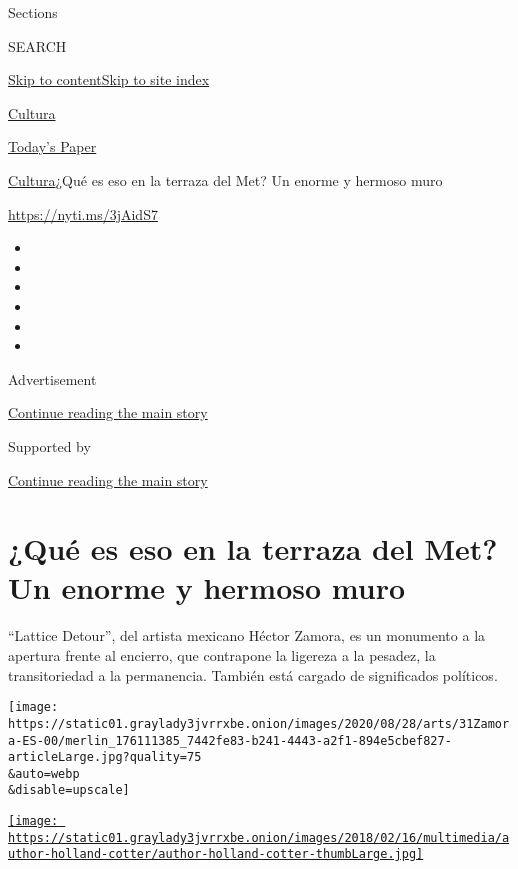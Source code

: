 Sections

SEARCH

\protect\hyperlink{site-content}{Skip to
content}\protect\hyperlink{site-index}{Skip to site index}

\href{https://www.nytimes3xbfgragh.onion/es/section/cultura}{Cultura}

\href{https://myaccount.nytimes3xbfgragh.onion/auth/login?response_type=cookie\&client_id=vi}{}

\href{https://www.nytimes3xbfgragh.onion/section/todayspaper}{Today's
Paper}

\href{/es/section/cultura}{Cultura}\textbar{}¿Qué es eso en la terraza
del Met? Un enorme y hermoso muro

\url{https://nyti.ms/3jAidS7}

\begin{itemize}
\item
\item
\item
\item
\item
\item
\end{itemize}

Advertisement

\protect\hyperlink{after-top}{Continue reading the main story}

Supported by

\protect\hyperlink{after-sponsor}{Continue reading the main story}

\hypertarget{quuxe9-es-eso-en-la-terraza-del-met-un-enorme-y-hermoso-muro}{%
\section{¿Qué es eso en la terraza del Met? Un enorme y hermoso
muro}\label{quuxe9-es-eso-en-la-terraza-del-met-un-enorme-y-hermoso-muro}}

``Lattice Detour'', del artista mexicano Héctor Zamora, es un monumento
a la apertura frente al encierro, que contrapone la ligereza a la
pesadez, la transitoriedad a la permanencia. También está cargado de
significados políticos.

\texttt{[image: https://static01.graylady3jvrrxbe.onion/images/2020/08/28/arts/31Zamora-ES-00/merlin\_176111385\_7442fe83-b241-4443-a2f1-894e5cbef827-articleLarge.jpg?quality=75\\\&auto=webp\\\&disable=upscale]}

\href{https://www.nytimes3xbfgragh.onion/by/holland-cotter}{\texttt{[image: https://static01.graylady3jvrrxbe.onion/images/2018/02/16/multimedia/author-holland-cotter/author-holland-cotter-thumbLarge.jpg]}}

